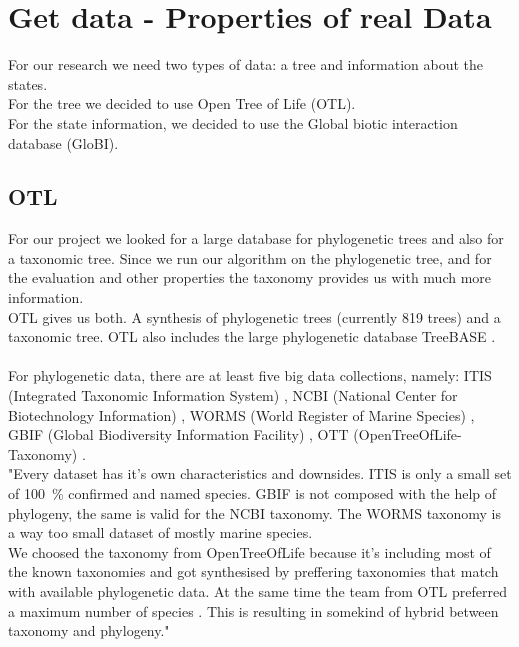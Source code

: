   \section{Get data - Properties of real Data}
    For our research we need two types of data: a tree and information about the states. \\
    For the tree we decided to use Open Tree of Life (OTL). \\
    For the state information, we decided to use the Global biotic interaction database (GloBI).

    \subsection{OTL}
      For our project we looked for a large database for phylogenetic trees and also for a taxonomic 
        tree. Since we run our algorithm on the phylogenetic tree, and for the evaluation and other 
        properties the taxonomy provides us with much more information. \\
      OTL gives us both. A synthesis of phylogenetic trees (currently 819 trees) and a taxonomic tree. 
        OTL also includes the large phylogenetic database TreeBASE \cite{Hinchliff2015}. \\
       \\
      For phylogenetic data, there are at least five big data collections, namely: ITIS (Integrated 
        Taxonomic Information System) \cite{ITIS}, NCBI (National Center for Biotechnology Information) 
        \cite{NCBI1988}, WORMS (World Register of Marine Species) \cite{WoRMS2018}, GBIF (Global 
        Biodiversity Information Facility) \cite{GBIF}, OTT (OpenTreeOfLife-Taxonomy) 
        \cite{Hinchliff2015}. \\
       "Every dataset has it's own characteristics and downsides. ITIS is only a small 
        set of 100~\% confirmed and named species. GBIF is not composed with the help of phylogeny, the 
        same is valid for the NCBI taxonomy. The WORMS taxonomy is a way too small dataset of mostly 
        marine species. \\
      We choosed the taxonomy from OpenTreeOfLife because it's including most of the known taxonomies 
        and got synthesised by preffering taxonomies that match with available phylogenetic data. At the 
        same time the team from OTL preferred a maximum number of species \cite{Hinchliff2015}. This is 
        resulting in somekind of hybrid between taxonomy and phylogeny." \\

